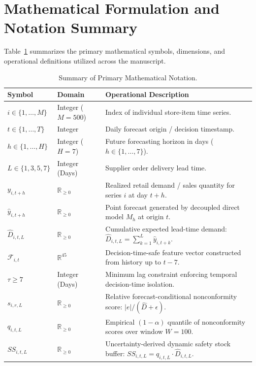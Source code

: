 
\appendix
\section{Mathematical Formulation and Notation Summary}
\label{app:notation}

Table~\ref{tab:app_notation} summarizes the primary mathematical symbols, dimensions, and operational definitions utilized across the manuscript.

\begin{table}[htbp]
\centering
\small
\caption{Summary of Primary Mathematical Notation.}
\label{tab:app_notation}
\begin{tabular}{llp{8cm}}
\toprule
\textbf{Symbol} & \textbf{Domain} & \textbf{Operational Description} \\
\midrule
$i \in \{1,\dots,M\}$ & Integer ($M=500$) & Index of individual store-item time series. \\
$t \in \{1,\dots,T\}$ & Integer & Daily forecast origin / decision timestamp. \\
$h \in \{1,\dots,H\}$ & Integer ($H=7$) & Future forecasting horizon in days ($h \in \{1, \dots, 7\}$). \\
$L \in \{1, 3, 5, 7\}$ & Integer (Days) & Supplier order delivery lead time. \\
$y_{i,t+h}$ & $\mathbb{R}_{\ge 0}$ & Realized retail demand / sales quantity for series $i$ at day $t+h$. \\
$\hat{y}_{i,t+h}$ & $\mathbb{R}_{\ge 0}$ & Point forecast generated by decoupled direct model $M_h$ at origin $t$. \\
$\hat{D}_{i,t,L}$ & $\mathbb{R}_{\ge 0}$ & Cumulative expected lead-time demand: $\hat{D}_{i,t,L} = \sum_{k=1}^L \hat{y}_{i,t+k}$. \\
$\mathcal{F}_{i,t}$ & $\mathbb{R}^{45}$ & Decision-time-safe feature vector constructed from history up to $t-7$. \\
$\tau \ge 7$ & Integer (Days) & Minimum lag constraint enforcing temporal decision-time isolation. \\
$s_{i,r,L}$ & $\mathbb{R}_{\ge 0}$ & Relative forecast-conditional nonconformity score: $|e| / (\hat{D} + \epsilon)$. \\
$q_{i,t,L}$ & $\mathbb{R}_{\ge 0}$ & Empirical $(1-\alpha)$ quantile of nonconformity scores over window $W=100$. \\
$SS_{i,t,L}$ & $\mathbb{R}_{\ge 0}$ & Uncertainty-derived dynamic safety stock buffer: $SS_{i,t,L} = q_{i,t,L} \cdot \hat{D}_{i,t,L}$. \\

\end{tabular}
\end{table}
